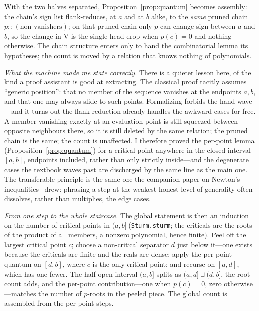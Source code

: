 \documentclass[11pt]{article}
\newcommand{\lean}[1]{\texttt{#1}}
\newcommand{\V}{\mathrm{V}}
\begin{document}
With the two halves separated, Proposition~\ref{prop:quantum} becomes assembly: the chain's sign
list flank-reduces, at $a$ and at $b$ alike, to the \emph{same} pruned chain $p\mathbin{:\!:}(\text{non-vanishers})$;
on that pruned chain only $p$ can change sign between $a$ and $b$, so the change in $\V$ is the
single head-drop when $p(c)=0$ and nothing otherwise. The chain structure enters only to hand the
combinatorial lemma its hypotheses; the count is moved by a relation that knows nothing of
polynomials.

\emph{What the machine made me state correctly.} There is a quieter lesson here, of the kind a
proof assistant is good at extracting. The classical proof tacitly assumes ``generic position'':
that no member of the sequence vanishes at the endpoints $a,b$, and that one may always slide to
such points. Formalizing forbids the hand-wave---and it turns out the flank-reduction already
handles the awkward cases for free. A member vanishing exactly at an evaluation point is still
squeezed between opposite neighbours there, so it is still deleted by the same relation; the pruned
chain is the same; the count is unaffected. I therefore proved the per-point lemma
(Proposition~\ref{prop:quantum}) for a critical point anywhere in the closed interval $[a,b]$,
endpoints included, rather than only strictly inside---and the degenerate cases the textbook waves
past are discharged by the same line as the main one. The transferable principle is the same one
the companion paper on Newton's inequalities~\cite{newton} drew: phrasing a step at the weakest
honest level of generality often dissolves, rather than multiplies, the edge cases.

\emph{From one step to the whole staircase.} The global statement is then an induction on the
number of critical points in $(a,b]$ (\lean{Sturm.sturm}; the criticals are the roots of the
product of all members, a nonzero polynomial, hence finite). Peel off the largest critical point
$c$; choose a non-critical separator $d$ just below it---one exists because the criticals are
finite and the reals are dense; apply the per-point quantum on $[d,b]$, where $c$ is the only
critical point; and recurse on $[a,d]$, which has one fewer. The half-open interval $(a,b]$ splits
as $(a,d]\sqcup(d,b]$, the root count adds, and the per-point contribution---one when $p(c)=0$,
zero otherwise---matches the number of $p$-roots in the peeled piece. The global count is assembled
from the per-point steps.
\end{document}
